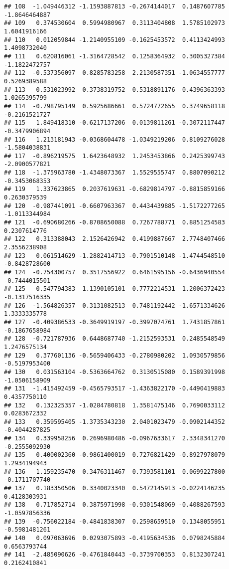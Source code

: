 \documentclass[
]{article}
\begin{document}
\begin{verbatim}
## 108  -1.049446312 -1.1593887813 -0.2674144017  0.1487607785 -1.8646464887
## 109   0.374530604  0.5994980967  0.3113404808  1.5785102973  1.6041916166
## 110   0.012059844 -1.2140955109 -0.1625453572  0.4113424993  1.4098732040
## 111   0.620816061 -1.3164728542  0.1258364932  0.3005327384 -1.1822472757
## 112  -0.537356097  0.8285783258  2.2130587351 -1.0634557777  0.5269389588
## 113   0.531023992  0.3738319752 -0.5318891176 -0.4396363393  1.0265395799
## 114  -0.798795149  0.5925686661  0.5724772655  0.3749658118 -0.2161521727
## 115   1.849418310 -0.6217137206  0.0139811261 -0.3072117447 -0.3479906894
## 116   1.213181943 -0.0368604478 -1.0349219206  0.8109276028 -1.5804038831
## 117  -0.896219575  1.6423648932  1.2453453866  0.2425399743 -2.0900577821
## 118  -1.375963780 -1.4348073367  1.5529555747  0.8807090212 -0.3453068353
## 119   1.337623865  0.2037619631 -0.6829814797 -0.8815859166  0.2630379539
## 120  -0.987441091 -0.6607963367  0.4434439885 -1.5172277265 -1.0113344984
## 121  -0.690680266 -0.8708650088  0.7267788771  0.8851254583  0.2307614776
## 122   0.313388043  2.1526426942  0.4199887667  2.7748407466  2.3556238908
## 123   0.061514629 -1.2882414713 -0.7901510148 -1.4744548510 -0.8428728600
## 124  -0.754300757  0.3517556922  0.6461595156 -0.6436940554 -0.7444015501
## 125  -0.547794383  1.1390105101  0.7772214531 -1.2006372423 -0.1317516335
## 126  -1.564826357  0.3131082513  0.7481192442 -1.6571334626  1.3333335778
## 127  -0.409386533 -0.3649919197 -0.3997074761  1.7431857861 -0.1867658984
## 128  -0.721787936  0.6448687740 -1.2152593531  0.2485548549  1.2476575134
## 129   0.377601136 -0.5659406433 -0.2780980202  1.0930579856 -0.5197953400
## 130   0.031563104 -0.5363664762  0.3130515080  0.1589391998 -1.0506158909
## 131  -1.415492459 -0.4565793517 -1.4363822170 -0.4490419883  0.4357750110
## 132   0.132325357 -1.0284780818  1.3581475146  0.7690033112  0.0283672332
## 133   0.359595405 -1.3735343230  2.0401023479 -0.0902144352 -0.4044287825
## 134   0.339958256  0.2696980486 -0.0967633617  2.3348341270 -0.2555092930
## 135   0.400002360 -0.9861400019  0.7276821429 -0.8927978079  1.2934194943
## 136   1.159235470  0.3476311467  0.7393581101 -0.0699227800 -0.1711707740
## 137   0.183350506  0.3340023340  0.5472145913 -0.0224146235  0.4128303931
## 138   0.717852714  0.3875971998 -0.9301548069 -0.4088267593 -1.0597856336
## 139  -0.756022184 -0.4841838307  0.2598659510  0.1348055951 -0.5981481261
## 140   0.097063696  0.0293075893 -0.4195634536  0.0798245884  0.6563793744
## 141  -2.485090626 -0.4761840443 -0.3739700353  0.8132307241  0.2162410841

\end{verbatim}
\end{document}
